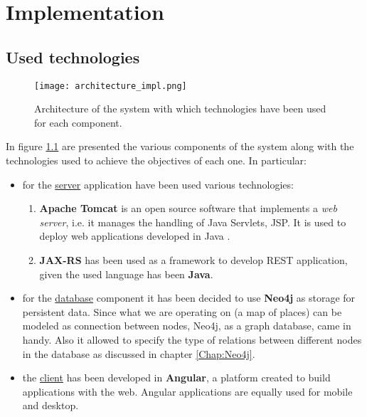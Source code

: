\chapter{Implementation}\label{Chap:Impl}
\section{Used technologies}
\begin{figure}[!htb]
   \centering
   \texttt{[image: architecture\_impl.png]}
   \caption{Architecture of the system with which technologies have been used for each component.}\label{Fig:ArchImpl}
\end{figure}
In figure \ref{Fig:ArchImpl} are presented the various components of the system along with the technologies used to achieve the objectives of each one. In particular:
\begin{itemize}
  \item for the \underline{server} application have been used various technologies:
    \begin{enumerate}
      \item \textbf{Apache Tomcat} is an open source software that implements a \textit{web server}, i.e. it manages the handling of Java Servlets, JSP. It is used to deploy web applications developed in Java \parencite{tomcat}.
      \item \textbf{JAX-RS} has been used as a framework to develop REST application, given the used language has been \textbf{Java}.
    \end{enumerate}
  \item for the \underline{database} component it has been decided to use \textbf{Neo4j} as storage for persistent data. Since what we are operating on (a map of places) can be modeled as connection between nodes, Neo4j, as a graph database, came in handy. Also it allowed to specify the type of relations between different nodes in the database as discussed in chapter \ref{Chap:Neo4j}.
  \item the \underline{client} has been developed in \textbf{Angular}, a platform created to build applications with the web. Angular applications are equally used for mobile and desktop.
\end{itemize}


